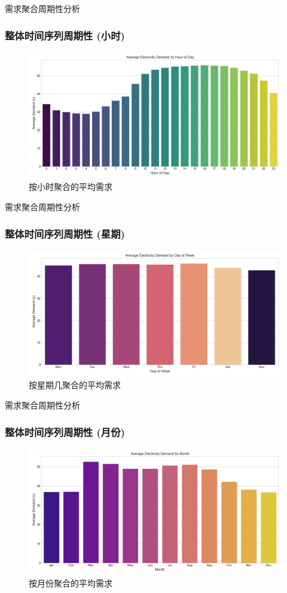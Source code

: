 \documentclass{beamer} %
\begin{document}
\begin{frame}{需求聚合周期性分析}
    \frametitle{整体时间序列周期性 (小时)}
    \begin{figure}[H]
        \centering
        \includegraphics[width=\textwidth]{../plots/avg_demand_by_hour_spark.png}
        \caption{按小时聚合的平均需求}
    \end{figure}
\end{frame}

\begin{frame}{需求聚合周期性分析}
    \frametitle{整体时间序列周期性 (星期)}
    \begin{figure}[H]
        \centering
        \includegraphics[width=\textwidth]{../plots/avg_demand_by_dayofweek_spark.png}
        \caption{按星期几聚合的平均需求}
    \end{figure}
\end{frame}

\begin{frame}{需求聚合周期性分析}
    \frametitle{整体时间序列周期性 (月份)}
    \begin{figure}[H]
        \centering
        \includegraphics[width=\textwidth]{../plots/avg_demand_by_month_spark.png}
        \caption{按月份聚合的平均需求}
    \end{figure}
\end{frame}
\end{document}
